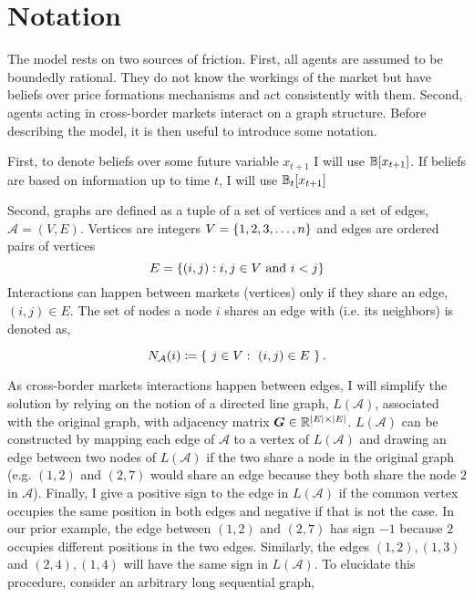 \section{Notation}
The model rests on two sources of friction. First, all agents are assumed to be boundedly rational. They do not know the workings of the market but have beliefs over price formations mechanisms and act consistently with them. Second, agents acting in cross-border markets interact on a graph structure. Before describing the model, it is then useful to introduce some notation.

First, to denote beliefs over some future variable $x_{t+1}$ I will use $\mathbb{B}[x_{t+1}]$. If beliefs are based on information up to time $t$, I will use $\mathbb{B}_t[x_{t+1}]$

Second, graphs are defined as a tuple of a set of vertices and a set of edges, $\mathcal{A} = (V, E)$. Vertices are integers $V = \left\{1, 2, 3, \ldots, n\right\}$ and edges are ordered pairs of vertices \begin{equation*}E = \left\{(i, j) : i, j \in V \text{ and } i < j\right\}\end{equation*}  Interactions can happen between markets (vertices) only if they share an edge, $(i, j) \in E$. The set of nodes a node $i$ shares an edge with (i.e. its neighbors) is denoted as,

\begin{equation}
    N_{\mathcal{A}}(i) \coloneqq \left\{ \ j \in V: \ (i, j) \in E \ \right\}.
\end{equation}


As cross-border markets interactions happen between edges, I will simplify the solution by relying on the notion of a directed line graph, $L(\mathcal{A})$, associated with the original graph, with adjacency matrix $\bm{G} \in \mathbb{R}^{\lvert E\rvert\times \lvert E\rvert}$. $L(\mathcal{A})$ can be constructed by mapping each edge of $\mathcal{A}$ to a vertex of $L(\mathcal{A})$ and drawing an edge between two nodes of $L(\mathcal{A})$ if the two share a node in the original graph (e.g. $(1, 2)$ and $(2, 7)$ would share an edge because they both share the node $2$ in $\mathcal{A}$). Finally, I give a positive sign to the edge in $L(\mathcal{A})$ if the common vertex occupies the same position in both edges and negative if that is not the case. In our prior example, the edge between $(1, 2)$ and $(2, 7)$ has sign $-1$ because $2$ occupies different positions in the two edges. Similarly, the edges $(1, 2), (1, 3)$ and $(2, 4), (1, 4)$ will have the same sign in $L(\mathcal{A})$. To elucidate this procedure, consider an arbitrary long sequential graph,

